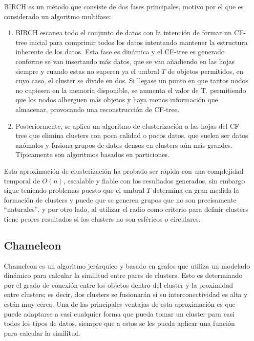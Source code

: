 \documentclass[10pt, a4paper]{article}
\begin{document}
BIRCH es un método que consiste de dos fases principales, motivo por el que es considerado un algoritmo multifase:

\begin{enumerate}
  \item BIRCH escanea todo el conjunto de datos con la intención de formar un CF-tree inicial para comprimir todos los datos intentando mantener la estructura inherente de los datos. Esta fase es dinámica y el CF-tree es generado conforme se van insertando más datos, que se van añadiendo en las hojas siempre y cuando estas no superen ya el umbral $T$ de objetos permitidos, en cuyo caso, el cluster se divide en dos. Si llegase un punto en que tantos nodos no cupiesen en la memoria disponible, se aumenta el valor de T, permitiendo que los nodos alberguen más objetos y haya menos información que almacenar, provocando una reconstrucción de CF-tree.
  \item Posteriormente, se aplica un algoritmo de clusterización a las hojas del CF-tree que elimina clusters con poca calidad o pocos datos, que suelen ser datos anómalos y fusiona grupos de datos densos en clusters aún más grandes. Típicamente son algoritmos basados en particiones.
\end{enumerate}

Esta aproximación de clusterización ha probado ser rápida con una complejidad temporal de $O\left(n \right)$, escalable y fiable con los resultados generados, sin embargo sigue teniendo problemas puesto que el umbral $T$ determina en gran medida la formación de clusters y puede que se generen grupos que no son precisamente ``naturales'', y por otro lado, al utilizar el radio como criterio para definir clusters tiene peores resultados si los clusters no son esféricos o circulares.




\subsection{\textbf{Chameleon}} \label{subsec:Chameleon}


\cite{chameleon} Chameleon es un algoritmo jerárquico y basado en grafos que utiliza un modelado dinámico para calcular la similitud entre pares de clusters. Esto es determinado por el grado de conexión entre los objetos dentro del cluster y la proximidad entre clusters; es decir, dos clusters se fusionarán si su interconectividad es alta y están muy cerca. Una de las principales ventajas de esta aproximación es que puede adaptarse a casi cualquier forma que pueda tomar un cluster para casi todos los tipos de datos, siempre que a estos se les pueda aplicar una función para calcular la similitud.
\end{document}
